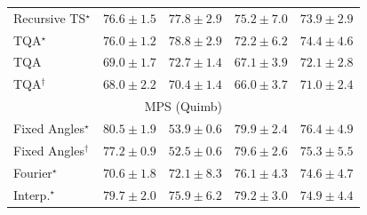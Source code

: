 \begin{tabular}{l|cccc|}
Recursive TS$^\star$ & {\cellcolor[HTML]{8A59A8}} \color[HTML]{F1F1F1} $76.6\pm 1.5$ & {\cellcolor[HTML]{894FA3}} \color[HTML]{F1F1F1} $77.8\pm 2.9$ & {\cellcolor[HTML]{8C66AF}} \color[HTML]{F1F1F1} $75.2\pm 7.0$ & {\cellcolor[HTML]{8C74B5}} \color[HTML]{F1F1F1} $73.9\pm 2.9$ \\
TQA$^\star$ & {\cellcolor[HTML]{8B60AC}} \color[HTML]{F1F1F1} $76.0\pm 1.2$ & {\cellcolor[HTML]{88449E}} \color[HTML]{F1F1F1} $78.8\pm 2.9$ & {\cellcolor[HTML]{8C84BD}} \color[HTML]{F1F1F1} $72.2\pm 6.2$ & {\cellcolor[HTML]{8C6EB3}} \color[HTML]{F1F1F1} $74.4\pm 4.6$ \\
TQA & {\cellcolor[HTML]{91A1CC}} \color[HTML]{F1F1F1} $69.0\pm 1.7$ & {\cellcolor[HTML]{8C7EBA}} \color[HTML]{F1F1F1} $72.7\pm 1.4$ & {\cellcolor[HTML]{99B2D5}} \color[HTML]{000000} $67.1\pm 3.9$ & {\cellcolor[HTML]{8C85BE}} \color[HTML]{F1F1F1} $72.1\pm 2.8$ \\
TQA$^\dagger$ & {\cellcolor[HTML]{95AAD0}} \color[HTML]{F1F1F1} $68.0\pm 2.2$ & {\cellcolor[HTML]{8C95C6}} \color[HTML]{F1F1F1} $70.4\pm 1.4$ & {\cellcolor[HTML]{9DBAD9}} \color[HTML]{000000} $66.0\pm 3.7$ & {\cellcolor[HTML]{8C8FC2}} \color[HTML]{F1F1F1} $71.0\pm 2.4$ \\
\cline{1-5}
\multicolumn{5}{c}{\rule{0pt}{8pt}MPS (Quimb)} \\
\midrule
Fixed Angles$^\star$ & {\cellcolor[HTML]{BC4503}} \color[HTML]{F1F1F1} $80.5\pm 1.9$ & {\cellcolor[HTML]{FFFCD8}} \color[HTML]{000000} $53.9\pm 0.6$ & {\cellcolor[HTML]{C34802}} \color[HTML]{F1F1F1} $79.9\pm 2.4$ & {\cellcolor[HTML]{E0630D}} \color[HTML]{F1F1F1} $76.4\pm 4.9$ \\
Fixed Angles$^\dagger$ & {\cellcolor[HTML]{DA5C0A}} \color[HTML]{F1F1F1} $77.2\pm 0.9$ & {\cellcolor[HTML]{FFFFE5}} \color[HTML]{000000} $52.5\pm 0.6$ & {\cellcolor[HTML]{C84A02}} \color[HTML]{F1F1F1} $79.6\pm 2.6$ & {\cellcolor[HTML]{E86C12}} \color[HTML]{F1F1F1} $75.3\pm 5.5$ \\
Fourier$^\star$ & {\cellcolor[HTML]{FD9627}} \color[HTML]{000000} $70.6\pm 1.8$ & {\cellcolor[HTML]{F78921}} \color[HTML]{F1F1F1} $72.1\pm 8.3$ & {\cellcolor[HTML]{E2650F}} \color[HTML]{F1F1F1} $76.1\pm 4.3$ & {\cellcolor[HTML]{ED7215}} \color[HTML]{F1F1F1} $74.6\pm 4.7$ \\
Interp.$^\star$ & {\cellcolor[HTML]{C64902}} \color[HTML]{F1F1F1} $79.7\pm 2.0$ & {\cellcolor[HTML]{E3660F}} \color[HTML]{F1F1F1} $75.9\pm 6.2$ & {\cellcolor[HTML]{CB4B02}} \color[HTML]{F1F1F1} $79.2\pm 3.0$ & {\cellcolor[HTML]{EA6E13}} \color[HTML]{F1F1F1} $74.9\pm 4.4$ \\

\end{tabular}
